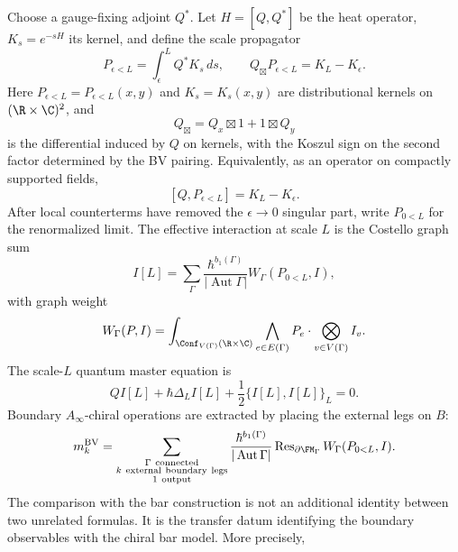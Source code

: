 Choose a gauge-fixing adjoint \(Q^*\). Let \(H=[Q,Q^*]\) be the heat
operator, \(K_s=e^{-sH}\) its kernel, and define the scale propagator
\begin{equation}\label{eq:3dht-heat-propagator}
 P_{\epsilon<L}
 =
 \int_{\epsilon}^{L} Q^*K_s\,ds,
 \qquad
 Q_{\boxtimes}P_{\epsilon<L}=K_L-K_\epsilon.
\end{equation}
Here \(P_{\epsilon<L}=P_{\epsilon<L}(x,y)\) and \(K_s=K_s(x,y)\) are
distributional kernels on \((\R\times\C)^2\), and
\[
 Q_{\boxtimes}=Q_x\boxtimes 1+1\boxtimes Q_y
\]
is the differential induced by \(Q\) on kernels, with the Koszul sign on
the second factor determined by the BV pairing. Equivalently, as an
operator on compactly supported fields,
\begin{equation}\label{eq:3dht-propagator-kernel-homotopy}
 [Q,P_{\epsilon<L}]=K_L-K_\epsilon .
\end{equation}
After local counterterms have removed the \(\epsilon\to0\) singular
part, write \(P_{0<L}\) for the renormalized limit. The effective
interaction at scale \(L\) is the Costello graph sum
\begin{equation}\label{eq:3dht-effective-interaction}
 I[L]
 =
 \sum_{\Gamma}
 \frac{\hbar^{b_1(\Gamma)}}{|\operatorname{Aut}\Gamma|}
 W_\Gamma(P_{0<L},I),
\end{equation}
with graph weight
\begin{equation}\label{eq:3dht-graph-weight}
 W_\Gamma(P,I)
 =
 \int_{\Conf_{V(\Gamma)}(\R\times\C)}
 \bigwedge_{e\in E(\Gamma)}P_e\cdot
 \bigotimes_{v\in V(\Gamma)} I_v.
\end{equation}
The scale-\(L\) quantum master equation is
\begin{equation}\label{eq:3dht-scale-qme}
 QI[L]+\hbar\Delta_L I[L]+\frac12\{I[L],I[L]\}_L=0.
\end{equation}
Boundary \(A_\infty\)-chiral operations are extracted by placing the
external legs on \(B\):
\begin{equation}\label{eq:3dht-boundary-operations}
 m_k^{\mathrm{BV}}
 =
 \sum_{\substack{\Gamma\ \mathrm{connected}\\
 k\ \mathrm{external\ boundary\ legs}\\
 1\ \mathrm{output}}}
 \frac{\hbar^{b_1(\Gamma)}}{|\operatorname{Aut}\Gamma|}
 \operatorname{Res}_{\partial\FM_\Gamma} W_\Gamma(P_{0<L},I).
\end{equation}
The comparison with the bar construction is not an additional identity
between two unrelated formulas.  It is the transfer datum identifying
the boundary observables with the chiral bar model.  More precisely,
